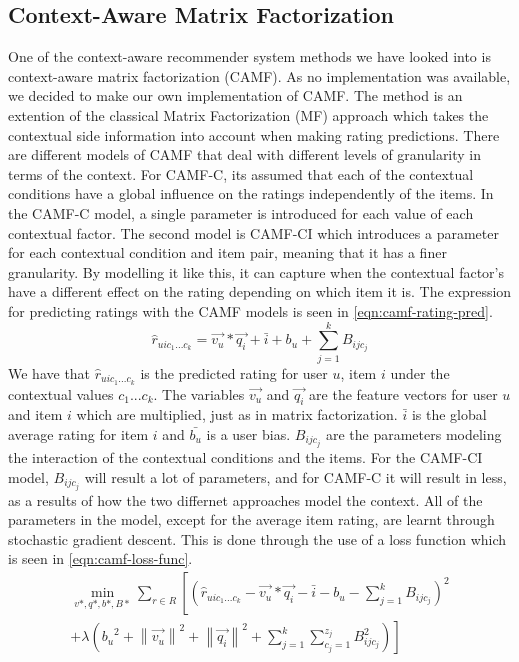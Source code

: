 \subsection{Context-Aware Matrix Factorization}
One of the context-aware recommender system methods we have looked into is context-aware matrix factorization (CAMF)\cite{baltrunasCAMF}.
As no implementation was available, we decided to make our own implementation of CAMF.
The method is an extention of the classical Matrix Factorization (MF) approach which takes the contextual side information into account when making rating predictions.
There are different models of CAMF that deal with different levels of granularity in terms of the context.
For CAMF-C, its assumed that each of the contextual conditions have a global influence on the ratings independently of the items.
In the CAMF-C model, a single parameter is introduced for each value of each contextual factor.
The second model is CAMF-CI which introduces a parameter for each contextual condition and item pair, meaning that it has a finer granularity.
By modelling it like this, it can capture when the contextual factor's have a different effect on the rating depending on which item it is.
The expression for predicting ratings with the CAMF models is seen in \autoref{eqn:camf-rating-pred}.
\begin{equation}
    \label{eqn:camf-rating-pred}
    \hat{r}_{uic_1...c_k} = \vec{v_u} * \vec{q_i} + \bar{i} + b_u + \sum\limits_{j = 1}^k B_{ijc_j}
\end{equation}
We have that $\hat{r}_{uic_1...c_k}$ is the predicted rating for user $u$, item $i$ under the contextual values $c_1...c_k$.
The variables $\vec{v_u} $ and $ \vec{q_i}$ are the feature vectors for user $u$ and item $i$ which are multiplied, just as in matrix factorization.
$\bar{i}$ is the global average rating for item $i$ and $\bar{b_u}$ is a user bias. 
$B_{ijc_j}$ are the parameters modeling the interaction of the contextual conditions and the items.
For the CAMF-CI model, $B_{ijc_j}$ will result a lot of parameters, and for CAMF-C it will result in less, as a results of how the two differnet approaches model the context.
All of the parameters in the model, except for the average item rating, are learnt through stochastic gradient descent.
This is done through the use of a loss function which is seen in \autoref{eqn:camf-loss-func}.
\begin{equation}
    \label{eqn:camf-loss-func}
    \begin{split}
        \min_{v*, q*, b*, B*}\sum \limits_{r \in  R}\left [ \left (  \hat{r}_{uic_1...c_k} - \vec{v_u} * \vec{q_i} - \bar{i} - b_u - \sum\limits_{j = 1}^k B_{ijc_j}\right )^2 \right. \\
        \left. + \lambda \left({b_u}^2 +{\left \| \vec{v_u} \right \|}^2  + {\left \|\vec{q_i}  \right \|}^2 + \sum\limits_{j = 1}^k \sum\limits_{c_j = 1}^{z_j} B_{ijc_j}^{2}\right ) \right ]
    \end{split}
\end{equation}
